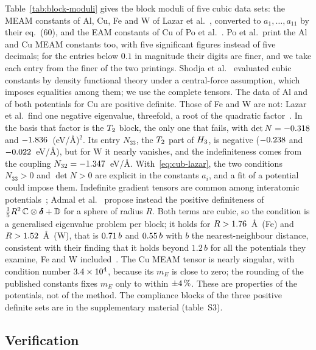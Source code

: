 Table~\ref{tab:block-moduli} gives the block moduli of five cubic data sets: the MEAM
constants of Al, Cu, Fe and W of Lazar et al.~\cite[table~1]{Lazar2022}, converted to
$a_1,\dots,a_{11}$ by their eq.~(60), and the EAM constants of Cu of Po et
al.~\cite[table~1]{Po2019}. Po et al.\ print the Al and Cu MEAM constants too, with five
significant figures instead of five decimals; for the entries below $0.1$ in magnitude
their digits are finer, and we take each entry from the finer of the two printings. Shodja et al.~\cite{Shodja2018} evaluated cubic constants by
density functional theory under a central-force assumption, which imposes equalities
among them; we
use the complete tensors. The data of Al and of both potentials for Cu are positive
definite. Those of Fe and W are not: Lazar et al.\ find one negative eigenvalue, threefold, a
root of the quadratic factor~\cite[eqs.~(130)--(133) and table~5]{Lazar2022}. In the basis
that factor is the $T_2$ block, the only one that fails, with $\det N=-0.318$ and $-1.836$~(eV/\AA)$^2$. Its
entry $N_{33}$, the $T_2$ part of $H_{3}$, is negative ($-0.238$ and
$-0.022$~eV/\AA), but for W it nearly vanishes, and the indefiniteness comes
from the coupling $N_{32}=-1.347$~eV/\AA. With~\eqref{eq:cub-lazar}, the two
conditions $N_{33}>0$ and $\det N>0$ are explicit in the constants $a_i$, and a fit of a
potential could impose them. Indefinite gradient tensors
are common among interatomic potentials~\cite{Admal2017,Lazar2022}; Admal et
al.~\cite[eq.~(3.11)]{Admal2017} propose instead the positive definiteness of
$\tfrac15R^2\,\mathbb{C}\otimes\bm{\delta}+\mathbb{D}$ for a sphere of radius $R$. Both terms are cubic, so the
condition is a generalised eigenvalue problem per block; it holds for
$R>1.76$~\AA\ (Fe) and $R>1.52$~\AA\ (W), that is
$0.71\,b$ and $0.55\,b$ with $b$ the
nearest-neighbour distance, consistent with their finding that it holds beyond $1.2\,b$ for
all the potentials they examine, Fe and W included~\cite[section~3]{Admal2017}. The Cu MEAM tensor
is nearly singular, with condition number $3.4\times10^{4}$, because its $m_E$ is close to
zero; the rounding of the published constants fixes $m_E$ only to within
$\pm4\,\%$. These are properties of the potentials, not of the
method. The compliance blocks of the three positive definite sets are in the
supplementary material (table~S3).

\subsection{Verification}\label{sec:compliance-verification}

